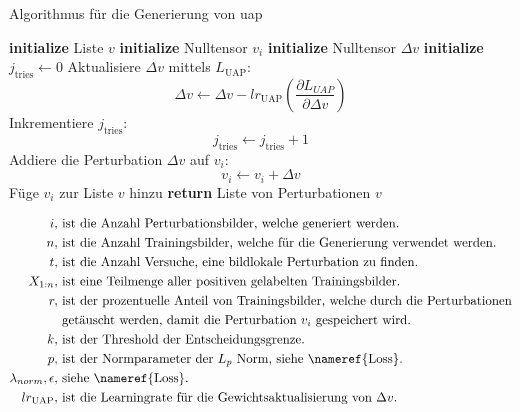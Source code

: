 \begin{algorithm}[H]
\caption{Algorithmus für die Generierung von \acrlong{uap}}
\begin{algorithmic}[1]
\label{algo:UAP Algorithmus}
\STATE \textbf{initialize} Liste $v$
    \STATE \textbf{initialize} Nulltensor $v_i$
        \STATE \textbf{initialize} Nulltensor $\Delta v$
        \STATE \textbf{initialize} $j_{\text{tries}} \gets 0$
            \STATE Aktualisiere $\Delta v$ mittels $L_{\text{UAP}}$: $$\Delta v \gets \Delta v - lr_{\text{UAP}} (\frac{\partial L_{UAP}}{\partial \Delta v})$$
            \STATE Inkrementiere $j_{\text{tries}}$: $$j_{\text{tries}} \gets j_{\text{tries}} + 1$$
            \ENDWHILE
            \STATE Addiere die Perturbation $\Delta v$ auf $v_i$: $$v_i \leftarrow v_i + \Delta v$$
        \ENDFOR
    \ENDWHILE
    \STATE Füge $v_i$ zur Liste $v$ hinzu
\ENDFOR
\STATE \textbf{return} Liste von Perturbationen $v$
\end{algorithmic}
\end{algorithm}

\begin{align*}
i, &\text{ ist die Anzahl Perturbationsbilder, welche generiert werden.} \\
n, &\text{ ist die Anzahl Trainingsbilder, welche für die Generierung verwendet werden.} \\
t, &\text{ ist die Anzahl Versuche, eine bildlokale Perturbation zu finden.}\\
X_{1:n}, &\text{ ist eine Teilmenge aller positiven gelabelten Trainingsbilder.} \\
r, &\text{ ist der prozentuelle Anteil von Trainingsbilder, welche durch die Perturbationen} \\ 
&\text{  getäuscht werden, damit die Perturbation } v_i \text{ gespeichert wird.} \\
k, &\text{ ist der Threshold der Entscheidungsgrenze.} \\
p, &\text{ ist der Normparameter der $L_p$ Norm, siehe \nameref{Loss}.}\\
\lambda_{norm},\epsilon, &\text{ siehe \nameref{Loss}.}\\
lr_{\text{UAP}}, &\text{ ist die Learningrate für die Gewichtsaktualisierung von $\Delta v$.}
\end{align*}

